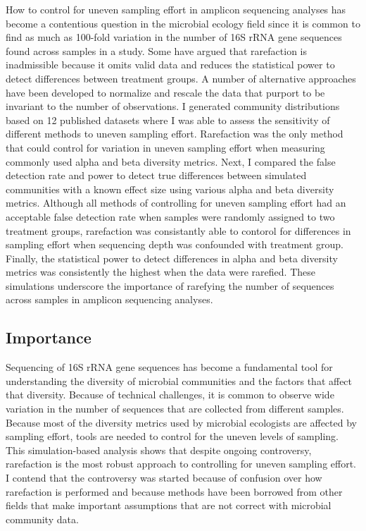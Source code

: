\documentclass[
]{article}
\begin{document}
How to control for uneven sampling effort in amplicon sequencing
analyses has become a contentious question in the microbial ecology
field since it is common to find as much as 100-fold variation in the
number of 16S rRNA gene sequences found across samples in a study. Some
have argued that rarefaction is inadmissible because it omits valid data
and reduces the statistical power to detect differences between
treatment groups. A number of alternative approaches have been developed
to normalize and rescale the data that purport to be invariant to the
number of observations. I generated community distributions based on 12
published datasets where I was able to assess the sensitivity of
different methods to uneven sampling effort. Rarefaction was the only
method that could control for variation in uneven sampling effort when
measuring commonly used alpha and beta diversity metrics. Next, I
compared the false detection rate and power to detect true differences
between simulated communities with a known effect size using various
alpha and beta diversity metrics. Although all methods of controlling
for uneven sampling effort had an acceptable false detection rate when
samples were randomly assigned to two treatment groups, rarefaction was
consistantly able to contorol for differences in sampling effort when
sequencing depth was confounded with treatment group. Finally, the
statistical power to detect differences in alpha and beta diversity
metrics was consistently the highest when the data were rarefied. These
simulations underscore the importance of rarefying the number of
sequences across samples in amplicon sequencing analyses.

\hypertarget{importance}{%
\subsection{Importance}\label{importance}}

Sequencing of 16S rRNA gene sequences has become a fundamental tool for
understanding the diversity of microbial communities and the factors
that affect that diversity. Because of technical challenges, it is
common to observe wide variation in the number of sequences that are
collected from different samples. Because most of the diversity metrics
used by microbial ecologists are affected by sampling effort, tools are
needed to control for the uneven levels of sampling. This
simulation-based analysis shows that despite ongoing controversy,
rarefaction is the most robust approach to controlling for uneven
sampling effort. I contend that the controversy was started because of
confusion over how rarefaction is performed and because methods have
been borrowed from other fields that make important assumptions that are
not correct with microbial community data.
\end{document}
